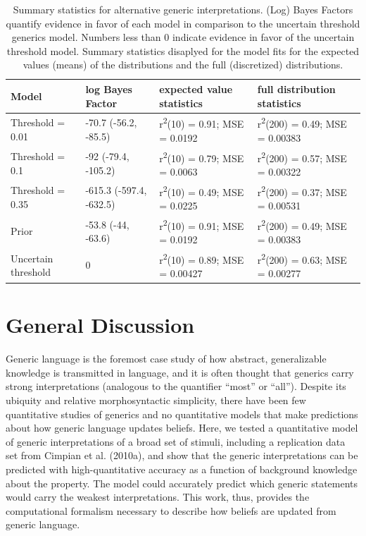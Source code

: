 \documentclass[,man,floatsintext]{apa6}
\theoremstyle{definition}
\theoremstyle{definition}
\theoremstyle{definition}
\theoremstyle{remark}
\begin{document}
\begin{table}[H]
\centering
\begingroup\fontsize{9pt}{10pt}\selectfont
\begin{tabular}{llll}
  \hline
Model & log Bayes Factor & expected value statistics & full distribution statistics \\ 
  \hline
Threshold = 0.01 & -70.7 (-56.2, -85.5) & r\textsuperscript{2}(10) = 0.91; MSE = 0.0192 & r\textsuperscript{2}(200) = 0.49; MSE = 0.00383 \\ 
  Threshold = 0.1 & -92 (-79.4, -105.2) & r\textsuperscript{2}(10) = 0.79; MSE = 0.0063 & r\textsuperscript{2}(200) = 0.57; MSE = 0.00322 \\ 
  Threshold = 0.35 & -615.3 (-597.4, -632.5) & r\textsuperscript{2}(10) = 0.49; MSE = 0.0225 & r\textsuperscript{2}(200) = 0.37; MSE = 0.00531 \\ 
  Prior & -53.8 (-44, -63.6) & r\textsuperscript{2}(10) = 0.91; MSE = 0.0192 & r\textsuperscript{2}(200) = 0.49; MSE = 0.00383 \\ 
  Uncertain threshold & 0 & r\textsuperscript{2}(10) = 0.89; MSE = 0.00427 & r\textsuperscript{2}(200) = 0.63; MSE = 0.00277 \\ 
   \hline
\end{tabular}
\endgroup
\caption{Summary statistics for alternative generic interpretations. (Log) Bayes Factors quantify evidence in favor of each model in comparison to the uncertain threshold generics model. Numbers less than 0 indicate evidence in favor of the uncertain threshold model. Summary statistics disaplyed for the model fits for the expected values (means) of the distributions and the full (discretized) distributions.} 
\end{table}

\hypertarget{general-discussion}{%
\section{General Discussion}\label{general-discussion}}

Generic language is the foremost case study of how abstract,
generalizable knowledge is transmitted in language, and it is often
thought that generics carry strong interpretations (analogous to the
quantifier \enquote{most} or \enquote{all}). Despite its ubiquity and
relative morphosyntactic simplicity, there have been few quantitative
studies of generics and no quantitative models that make predictions
about how generic language updates beliefs. Here, we tested a
quantitative model of generic interpretations of a broad set of stimuli,
including a replication data set from Cimpian et al. (2010a), and show
that the generic interpretations can be predicted with high-quantitative
accuracy as a function of background knowledge about the property. The
model could accurately predict which generic statements would carry the
weakest interpretations. This work, thus, provides the computational
formalism necessary to describe how beliefs are updated from generic
language.
\end{document}
